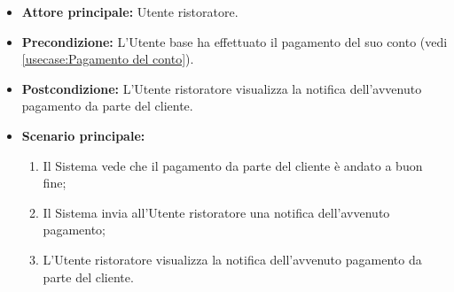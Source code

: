 \label{usecase:Visualizzazione notifica di avvenuto pagamento}
\begin{itemize}
	\item \textbf{Attore principale:} Utente ristoratore.
	
	\item \textbf{Precondizione:} L'Utente base ha effettuato il pagamento del suo conto (vedi \autoref{usecase:Pagamento del conto}).

    
	\item \textbf{Postcondizione:} L'Utente ristoratore visualizza la notifica dell'avvenuto pagamento da parte del cliente.
     
	\item \textbf{Scenario principale:}
	      \begin{enumerate}
                \item Il Sistema vede che il pagamento da parte del cliente è andato a buon fine;
                \item Il Sistema invia all'Utente ristoratore una notifica dell'avvenuto pagamento;
                \item L'Utente ristoratore visualizza la notifica dell'avvenuto pagamento da parte del cliente.
	      \end{enumerate}
\end{itemize}